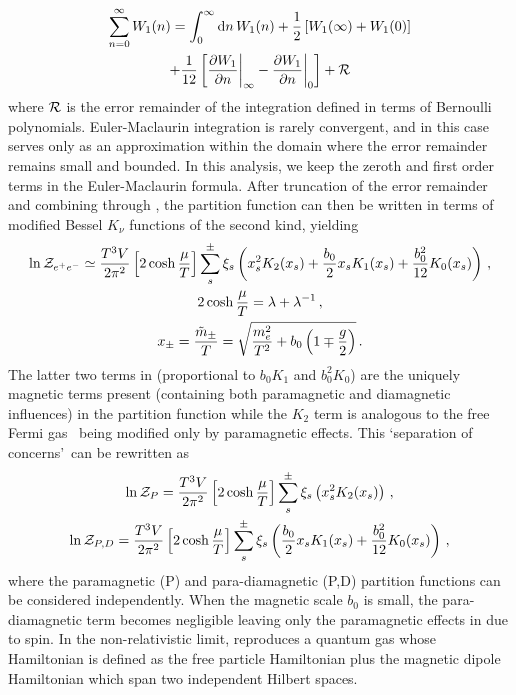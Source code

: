 \begin{multline}
 \label{eulermaclaurin}
 \sum_{n=0}^{\infty}W_{1}(n)=\int_{0}^{\infty}{\rm d}n\,W_{1}(n)+\frac{1}{2}\left[W_{1}(\infty)+W_{1}(0)\right]\\
 +\frac{1}{12}\left[\frac{\partial W_{1}}{\partial n}\bigg\vert_{\infty}-\frac{\partial W_{1}}{\partial n}\bigg\vert_{0}\right]+{\cal R}
\end{multline}
where ${\cal R}$ is the error remainder of the integration defined in terms of Bernoulli polynomials. Euler-Maclaurin integration is rarely convergent, and in this case serves only as an approximation within the domain where the error remainder remains small and bounded. In this analysis, we keep the zeroth and first order terms in the Euler-Maclaurin formula. After truncation of the error remainder and combining  through , the partition function can then be written in terms of modified Bessel $K_{\nu}$ functions of the second kind, yielding
\begin{gather}
 \label{boltzmann}
 \ln{\cal Z}_{e^{+}e^{-}}\simeq\frac{T^{3}V}{2\pi^{2}}\left[2\cosh{\frac{\mu}{T}}\right]\sum_{s}^{\pm}\xi_{s}
 \left(x_{s}^{2}K_{2}(x_{s})+\frac{b_{0}}{2}x_{s}K_{1}(x_{s})+\frac{b_{0}^{2}}{12}K_{0}(x_{s})\right)\,,\\
 \label{xfunc}
 2\cosh{\frac{\mu}{T}}=\lambda+\lambda^{-1}\,,\\
 x_{\pm}=\frac{{\tilde m}_{\pm}}{T}=\sqrt{\frac{m_{e}^{2}}{T^{2}}+b_{0}\left(1\mp\frac{g}{2}\right)}\,.
\end{gather}
The latter two terms in  (proportional to $b_{0}K_{1}$ and $b_{0}^{2}K_{0}$) are the uniquely magnetic terms present (containing both paramagnetic and diamagnetic influences) in the partition function while the $K_{2}$ term is analogous to the free Fermi gas~\cite{greiner2012thermodynamics} being modified only by paramagnetic effects. This \lq separation of concerns\rq\ can be rewritten as
\begin{gather}
 \label{para}
 \ln{\cal Z}_{P}=\frac{T^{3}V}{2\pi^{2}}\left[2\cosh{\frac{\mu}{T}}\right]\sum_{s}^{\pm}\xi_{s}\left(x_{s}^{2}K_{2}(x_{s})\right)\,,\\
 \label{paradia}
 \ln{\cal Z}_{P,D}=\frac{T^{3}V}{2\pi^{2}}\left[2\cosh{\frac{\mu}{T}}\right]\sum_{s}^{\pm}\xi_{s}\left(\frac{b_{0}}{2}x_{s}K_{1}(x_{s})+\frac{b_{0}^{2}}{12}K_{0}(x_{s})\right)\,,
\end{gather}
where the paramagnetic (P) and para-diamagnetic (P,D) partition functions can be considered independently. When the magnetic scale $b_{0}$ is small, the para-diamagnetic term  becomes negligible leaving only the paramagnetic effects in  due to spin. In the non-relativistic limit,  reproduces a quantum gas whose Hamiltonian is defined as the free particle Hamiltonian plus the magnetic dipole Hamiltonian which span two independent Hilbert spaces.


